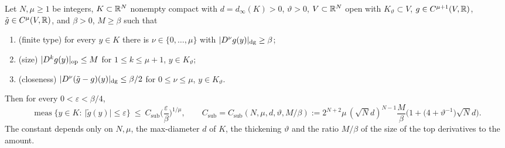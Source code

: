 \begin{theorem}\label{bpP:p11a:sublevel}
Let $N,\mu\ge1$ be integers, $K\subset\mathbb{R}^N$ nonempty compact with $d=d_\infty(K)>0$, $\vartheta>0$, $V\subset\mathbb{R}^N$ open with $K_\vartheta\subset V$, $g\in C^{\mu+1}(V,\mathbb{R})$, $\tilde g\in C^\mu(V,\mathbb{R})$, and $\beta>0$, $M\ge\beta$ such that
\begin{enumerate}[label=(S\arabic*),ref=(S\arabic*)]
\item\label{bpP:p11a:S1} (finite type) for every $y\in K$ there is $\nu\in\{0,\dots,\mu\}$ with $\lvert D^\nu g(y)\rvert_{\mathrm{dg}}\ge\beta$;
\item\label{bpP:p11a:S2} (size) $\lvert D^kg(y)\rvert_{\mathrm{op}}\le M$ for $1\le k\le\mu+1$, $y\in K_\vartheta$;
\item\label{bpP:p11a:S3} (closeness) $\lvert D^\nu(\tilde g-g)(y)\rvert_{\mathrm{dg}}\le\beta/2$ for $0\le\nu\le\mu$, $y\in K_\vartheta$.
\end{enumerate}
Then for every $0<\varepsilon<\beta/4$,
\[\operatorname{meas}\{y\in K:\ \lvert\tilde g(y)\rvert\le\varepsilon\}\ \le\ C_{\mathrm{sub}}\Big(\frac\varepsilon\beta\Big)^{1/\mu},\qquad C_{\mathrm{sub}}=C_{\mathrm{sub}}(N,\mu,d,\vartheta,M/\beta):=2^{N+2}\mu\,(\sqrt Nd)^{N-1}\frac M\beta\Big(1+\big(4+\vartheta^{-1}\big)\sqrt Nd\Big).\]
The constant depends only on $N,\mu$, the max-diameter $d$ of $K$, the thickening $\vartheta$ and the ratio $M/\beta$ of the size of the top derivatives to the amount.
\end{theorem}
